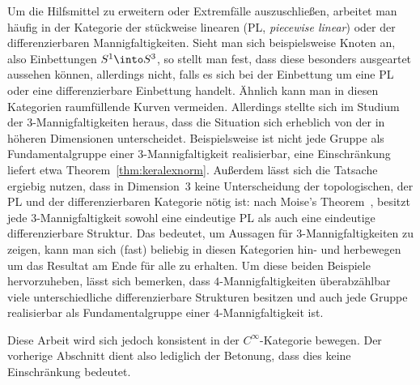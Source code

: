         Um die Hilfsmittel zu erweitern oder Extremfälle auszuschließen, arbeitet man häufig in der Kategorie der stückweise linearen (PL, \textit{piecewise linear}) oder der differenzierbaren Mannigfaltigkeiten. Sieht man sich beispielsweise Knoten an, also Einbettungen $S^1 \into S^3$, so stellt man fest, dass diese besonders ausgeartet aussehen können, allerdings nicht, falls es sich bei der Einbettung um eine PL oder eine differenzierbare Einbettung handelt. Ähnlich kann man in diesen Kategorien raumfüllende Kurven vermeiden. Allerdings stellte sich im Studium der $3$-Mannigfaltigkeiten heraus, dass die Situation sich erheblich von der in höheren Dimensionen unterscheidet. Beispielsweise ist nicht jede Gruppe als Fundamentalgruppe einer $3$-Mannigfaltigkeit realisierbar, eine Einschränkung liefert etwa Theorem~\ref{thm:keralexnorm}. Außerdem lässt sich die Tatsache ergiebig nutzen, dass in Dimension~$3$ keine Unterscheidung der topologischen, der PL und der differenzierbaren Kategorie nötig ist: nach Moise's Theorem~\cite{Moise.1952}, besitzt jede $3$-Mannigfaltigkeit sowohl eine eindeutige PL als auch eine eindeutige differenzierbare Struktur. Das bedeutet, um Aussagen für $3$-Mannigfaltigkeiten zu zeigen, kann man sich (fast) beliebig in diesen Kategorien hin- und herbewegen um das Resultat am Ende für alle zu erhalten. Um diese beiden Beispiele hervorzuheben, lässt sich bemerken, dass $4$-Mannigfaltigkeiten überabzählbar viele unterschiedliche differenzierbare Strukturen besitzen und auch jede Gruppe realisierbar als Fundamentalgruppe einer $4$-Mannigfaltigkeit ist.

        Diese Arbeit wird sich jedoch konsistent in der $C^\infty$-Kategorie bewegen. Der vorherige Abschnitt dient also lediglich der Betonung, dass dies keine Einschränkung bedeutet. 


